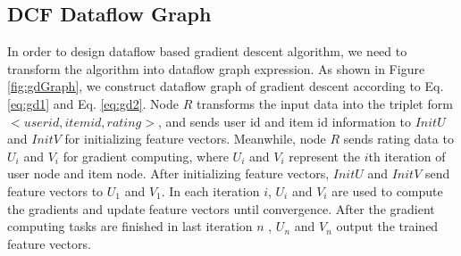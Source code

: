 \documentclass{llncs}
\begin{document}
\subsection{DCF Dataflow Graph}
In order to design dataflow based gradient descent algorithm, we need to transform the algorithm into dataflow graph expression. As shown in Figure \ref{fig:gdGraph}, we construct dataflow graph of gradient descent according to Eq. \ref{eq:gd1} and Eq. \ref{eq:gd2}. Node $R$ transforms the input data into the triplet form $<user id, item id , rating>$, and sends user id and item id information to $InitU$ and $InitV$ for initializing feature vectors.
Meanwhile, node $R$ sends rating data to $U_i$ and $V_i$ for gradient computing, where $U_i$ and $V_i$ represent the $i$th iteration of user node and item node. After initializing feature vectors, $InitU$ and $InitV$ send feature vectors to $U_1$ and $V_1$. In each iteration $i$, $U_i$ and $V_i$ are used to compute the gradients and update feature vectors until convergence. After the gradient computing tasks are finished in last iteration $n$ , $U_n$ and $V_n$ output the trained feature vectors.

\vspace{-10pt}
\end{document}
